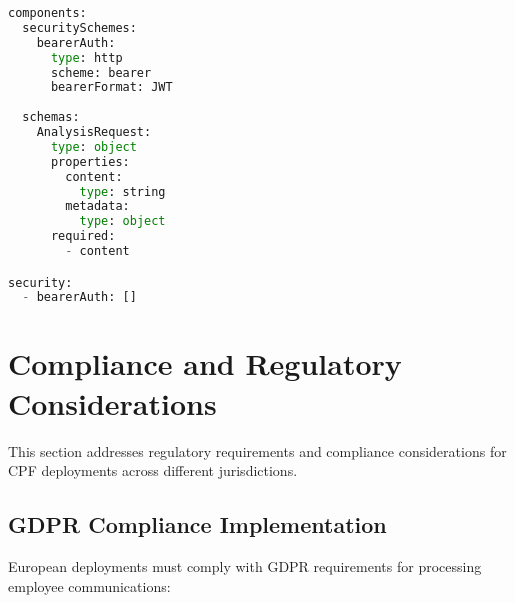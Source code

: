 \documentclass[11pt,a4paper]{article}
\begin{document}
\begin{lstlisting}[language=Python, caption=CPF REST API Specification]
components:
  securitySchemes:
    bearerAuth:
      type: http
      scheme: bearer
      bearerFormat: JWT
    
  schemas:
    AnalysisRequest:
      type: object
      properties:
        content:
          type: string
        metadata:
          type: object
      required:
        - content

security:
  - bearerAuth: []
\end{lstlisting}

\section{Compliance and Regulatory Considerations}
\label{app:compliance}

This section addresses regulatory requirements and compliance considerations for CPF deployments across different jurisdictions.

\subsection{GDPR Compliance Implementation}

European deployments must comply with GDPR requirements for processing employee communications:
\end{document}
